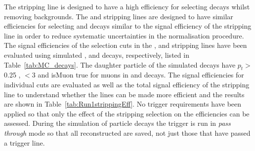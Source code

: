 The \bmumu stripping line is designed to have a high efficiency for selecting \bmumu decays whilst removing backgrounds. The \bhh and \bujpsik stripping lines are designed to have similar efficiencies for selecting \bhh and \bujpsik decays similar to the signal efficiency of the \bmumu stripping line in order to reduce systematic uncertainties in the normalisation procedure. 
The signal efficiencies of the selection cuts in the \bmumu, \bhh and \bujpsik stripping lines have been evaluated using simulated \bmumu, \bhh and \bujpsik decays, respectively, listed in Table~\ref{tab:MC_decays}. The daughter particle of the simulated decays have $p_t>$0.25 \gevc, \chitrk $<$3 and isMuon true for muons in \bmumu and \bujpsik decays. The signal efficiencies for individual cuts are evaluated as well as the total signal efficiency of the stripping line to understand whether the lines can be made more efficient and the results are shown in Table~\ref{tab:Run1strippingEff}. 
No trigger requirements have been applied so that only the effect of the stripping selection on the efficiencies can be assessed. During the simulation of particle decays the trigger is run in {\it pass through} mode so that all reconstructed are saved, not just those that have passed a trigger line.

